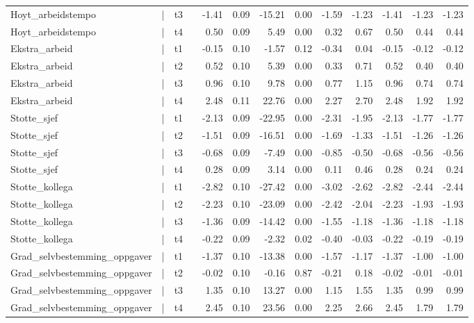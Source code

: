 \documentclass[
  12pt,
  a4paper,
  DIV=11,
  numbers=noendperiod]{scrartcl}
\begin{document}
\begin{table}[ht]
\begin{tabular}{llllrrrrrrrrr}
  Hoyt\_arbeidstempo & | & t3 &  & -1.41 & 0.09 & -15.21 & 0.00 & -1.59 & -1.23 & -1.41 & -1.23 & -1.23 \\ 
  Hoyt\_arbeidstempo & | & t4 &  & 0.50 & 0.09 & 5.49 & 0.00 & 0.32 & 0.67 & 0.50 & 0.44 & 0.44 \\ 
  Ekstra\_arbeid & | & t1 &  & -0.15 & 0.10 & -1.57 & 0.12 & -0.34 & 0.04 & -0.15 & -0.12 & -0.12 \\ 
  Ekstra\_arbeid & | & t2 &  & 0.52 & 0.10 & 5.39 & 0.00 & 0.33 & 0.71 & 0.52 & 0.40 & 0.40 \\ 
  Ekstra\_arbeid & | & t3 &  & 0.96 & 0.10 & 9.78 & 0.00 & 0.77 & 1.15 & 0.96 & 0.74 & 0.74 \\ 
  Ekstra\_arbeid & | & t4 &  & 2.48 & 0.11 & 22.76 & 0.00 & 2.27 & 2.70 & 2.48 & 1.92 & 1.92 \\ 
  Stotte\_sjef & | & t1 &  & -2.13 & 0.09 & -22.95 & 0.00 & -2.31 & -1.95 & -2.13 & -1.77 & -1.77 \\ 
  Stotte\_sjef & | & t2 &  & -1.51 & 0.09 & -16.51 & 0.00 & -1.69 & -1.33 & -1.51 & -1.26 & -1.26 \\ 
  Stotte\_sjef & | & t3 &  & -0.68 & 0.09 & -7.49 & 0.00 & -0.85 & -0.50 & -0.68 & -0.56 & -0.56 \\ 
  Stotte\_sjef & | & t4 &  & 0.28 & 0.09 & 3.14 & 0.00 & 0.11 & 0.46 & 0.28 & 0.24 & 0.24 \\ 
  Stotte\_kollega & | & t1 &  & -2.82 & 0.10 & -27.42 & 0.00 & -3.02 & -2.62 & -2.82 & -2.44 & -2.44 \\ 
  Stotte\_kollega & | & t2 &  & -2.23 & 0.10 & -23.09 & 0.00 & -2.42 & -2.04 & -2.23 & -1.93 & -1.93 \\ 
  Stotte\_kollega & | & t3 &  & -1.36 & 0.09 & -14.42 & 0.00 & -1.55 & -1.18 & -1.36 & -1.18 & -1.18 \\ 
  Stotte\_kollega & | & t4 &  & -0.22 & 0.09 & -2.32 & 0.02 & -0.40 & -0.03 & -0.22 & -0.19 & -0.19 \\ 
  Grad\_selvbestemming\_oppgaver & | & t1 &  & -1.37 & 0.10 & -13.38 & 0.00 & -1.57 & -1.17 & -1.37 & -1.00 & -1.00 \\ 
  Grad\_selvbestemming\_oppgaver & | & t2 &  & -0.02 & 0.10 & -0.16 & 0.87 & -0.21 & 0.18 & -0.02 & -0.01 & -0.01 \\ 
  Grad\_selvbestemming\_oppgaver & | & t3 &  & 1.35 & 0.10 & 13.27 & 0.00 & 1.15 & 1.55 & 1.35 & 0.99 & 0.99 \\ 
  Grad\_selvbestemming\_oppgaver & | & t4 &  & 2.45 & 0.10 & 23.56 & 0.00 & 2.25 & 2.66 & 2.45 & 1.79 & 1.79 \\ 

\end{tabular}
\end{table}
\end{document}
